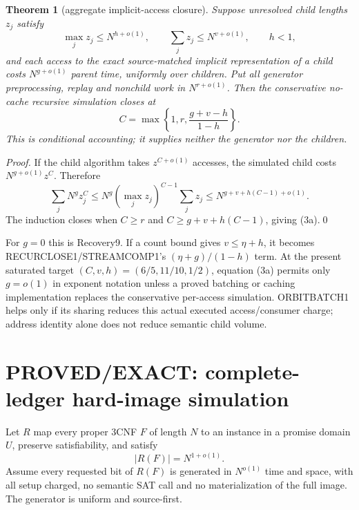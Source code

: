 \documentclass[11pt]{article}
\newtheorem{theorem}{Theorem}
\begin{document}
\begin{theorem}[aggregate implicit-access closure]
Suppose unresolved child lengths $z_j$ satisfy
\[
 \max_jz_j\le N^{h+o(1)},\qquad \sum_jz_j\le N^{v+o(1)},
 \qquad h<1,
\]
and each access to the exact source-matched implicit representation of a
child costs $N^{g+o(1)}$ parent time, uniformly over children.  Put all
generator preprocessing, replay and nonchild work in $N^{r+o(1)}$.  Then the
conservative no-cache recursive simulation closes at
\[
 \boxed{C=\max\left\{1,r,\frac{g+v-h}{1-h}\right\}}.   \tag{3a}
\]
This is conditional accounting; it supplies neither the generator nor the
children.
\end{theorem}
\begin{proof}
If the child algorithm takes $z^{C+o(1)}$ accesses, the simulated child costs
$N^{g+o(1)}z^C$.  Therefore
\[
 \sum_jN^gz_j^C\le
 N^g(\max_jz_j)^{C-1}\sum_jz_j
 \le N^{g+v+h(C-1)+o(1)}.
\]
The induction closes when $C\ge r$ and
$C\ge g+v+h(C-1)$, giving (3a).\qed
\end{proof}

For $g=0$ this is Recovery9.  If a count bound gives
$v\le\eta+h$, it becomes RECURCLOSE1/STREAMCOMP1's
$(\eta+g)/(1-h)$ term.  At the present saturated target
$(C,v,h)=(6/5,11/10,1/2)$, equation (3a) permits only $g=o(1)$ in exponent
notation unless a proved batching or caching implementation replaces the
conservative per-access simulation.  ORBITBATCH1 helps only if its sharing
reduces this actual executed access/consumer charge; address identity alone
does not reduce semantic child volume.

\section{PROVED/EXACT: complete-ledger hard-image simulation}

Let $R$ map every proper 3CNF $F$ of length $N$ to an instance in a promise
domain $U$, preserve satisfiability, and satisfy
\[
 |R(F)|=N^{1+o(1)}.                                    \tag{3}
\]
Assume every requested bit of $R(F)$ is generated in $N^{o(1)}$ time and
space, with all setup charged, no semantic SAT call and no materialization of
the full image.  The generator is uniform and source-first.
\end{document}
